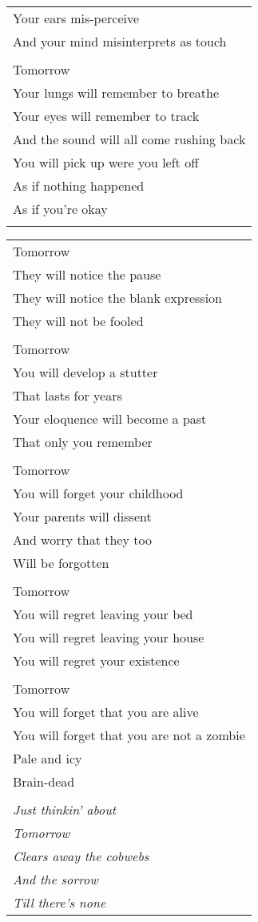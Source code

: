 \documentclass{article}
\begin{document}
\begin{center}
\begin{tabular}{l}
Your ears mis-perceive \\
And your mind misinterprets as touch \\
\\
Tomorrow \\
Your lungs will remember to breathe \\
Your eyes will remember to track \\
And the sound will all come rushing back \\
You will pick up were you left off \\
As if nothing happened \\
As if you're okay \\
\\
\end{tabular}
\begin{tabular}{l}
\\
Tomorrow \\
They will notice the pause \\
They will notice the blank expression \\
They will not be fooled \\
\\
Tomorrow \\
You will develop a stutter \\
That lasts for years \\
Your eloquence will become a past \\
That only you remember \\
\\
Tomorrow \\
You will forget your childhood \\
Your parents will dissent \\
And worry that they too \\
Will be forgotten \\
\\
Tomorrow \\
You will regret leaving your bed \\
You will regret leaving your house \\
You will regret your existence \\
\\
Tomorrow \\
You will forget that you are alive \\
You will forget that you are not a zombie \\
Pale and icy \\
Brain-dead \\
\\
\textit{Just thinkin' about} \\
\textit{Tomorrow} \\
\textit{Clears away the cobwebs} \\
\textit{And the sorrow} \\
\textit{Till there's none} \\
\end{tabular}
\end{center}
\end{document}
